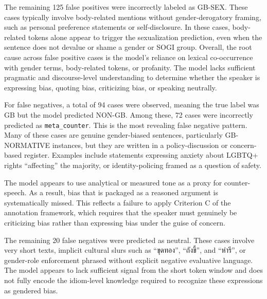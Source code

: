 \documentclass[12pt,oneside,openright,a4paper]{cpe-english-project}
\begin{document}
The remaining 125 false positives were incorrectly labeled as GB-SEX. These cases typically involve body-related mentions without gender-derogatory framing, such as personal preference statements or self-disclosure. In these cases, body-related tokens alone appear to trigger the sexualization prediction, even when the sentence does not devalue or shame a gender or SOGI group. Overall, the root cause across false positive cases is the model's reliance on lexical co-occurrence with gender terms, body-related tokens, or profanity. The model lacks sufficient pragmatic and discourse-level understanding to determine whether the speaker is expressing bias, quoting bias, criticizing bias, or speaking neutrally.

For false negatives, a total of 94 cases were observed, meaning the true label was GB but the model predicted NON-GB. Among these, 72 cases were incorrectly predicted as \texttt{meta\_counter}. This is the most revealing false negative pattern. Many of these cases are genuine gender-biased sentences, particularly GB-NORMATIVE instances, but they are written in a policy-discussion or concern-based register. Examples include statements expressing anxiety about LGBTQ+ rights ``affecting'' the majority, or identity-policing framed as a question of safety.

The model appears to use analytical or measured tone as a proxy for counter-speech. As a result, bias that is packaged as a reasoned argument is systematically missed. This reflects a failure to apply Criterion C of the annotation framework, which requires that the speaker must genuinely be criticizing bias rather than expressing bias under the guise of concern.

The remaining 20 false negatives were predicted as neutral. These cases involve very short texts, implicit cultural slurs such as ``ขุดทอง'', ``ถังขี้'', and ``หำรี'', or gender-role enforcement phrased without explicit negative evaluative language. The model appears to lack sufficient signal from the short token window and does not fully encode the idiom-level knowledge required to recognize these expressions as gendered bias.
\end{document}
